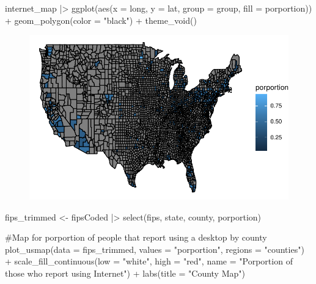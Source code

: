 \documentclass[
  letterpaper,
  DIV=11,
  numbers=noendperiod]{scrartcl}
\newenvironment{Shaded}{\begin{snugshade}}{\end{snugshade}}
\newcommand{\AttributeTok}[1]{\textcolor[rgb]{0.40,0.45,0.13}{#1}}
\newcommand{\CommentTok}[1]{\textcolor[rgb]{0.37,0.37,0.37}{#1}}
\newcommand{\FunctionTok}[1]{\textcolor[rgb]{0.28,0.35,0.67}{#1}}
\newcommand{\NormalTok}[1]{\textcolor[rgb]{0.00,0.23,0.31}{#1}}
\newcommand{\OtherTok}[1]{\textcolor[rgb]{0.00,0.23,0.31}{#1}}
\newcommand{\SpecialCharTok}[1]{\textcolor[rgb]{0.37,0.37,0.37}{#1}}
\newcommand{\StringTok}[1]{\textcolor[rgb]{0.13,0.47,0.30}{#1}}
\begin{document}
\begin{Shaded}
\begin{Highlighting}[]
\NormalTok{internet\_map }\SpecialCharTok{|\textgreater{}}
  \FunctionTok{ggplot}\NormalTok{(}\FunctionTok{aes}\NormalTok{(}\AttributeTok{x =}\NormalTok{ long, }\AttributeTok{y =}\NormalTok{ lat, }\AttributeTok{group =}\NormalTok{ group, }\AttributeTok{fill =}\NormalTok{ porportion)) }\SpecialCharTok{+}
  \FunctionTok{geom\_polygon}\NormalTok{(}\AttributeTok{color =} \StringTok{"black"}\NormalTok{) }\SpecialCharTok{+}
  \FunctionTok{theme\_void}\NormalTok{()}
\end{Highlighting}
\end{Shaded}

\begin{figure}[H]

{\centering \includegraphics{GeospatialMapping_files/figure-pdf/mapping-internet-use-1.pdf}

}

\end{figure}

\begin{Shaded}
\begin{Highlighting}[]
\NormalTok{fips\_trimmed }\OtherTok{\textless{}{-}}\NormalTok{ fipsCoded }\SpecialCharTok{|\textgreater{}}
  \FunctionTok{select}\NormalTok{(fips, state, county, porportion)}

\CommentTok{\#Map for porportion of people that report using a desktop by county}
\FunctionTok{plot\_usmap}\NormalTok{(}\AttributeTok{data =}\NormalTok{ fips\_trimmed, }
           \AttributeTok{values =} \StringTok{"porportion"}\NormalTok{,}
           \AttributeTok{regions =} \StringTok{"counties"}\NormalTok{) }\SpecialCharTok{+}
  \FunctionTok{scale\_fill\_continuous}\NormalTok{(}\AttributeTok{low =} \StringTok{"white"}\NormalTok{, }\AttributeTok{high =} \StringTok{"red"}\NormalTok{, }\AttributeTok{name =} \StringTok{"Porportion of those who report using Internet"}\NormalTok{) }\SpecialCharTok{+} 
  \FunctionTok{labs}\NormalTok{(}\AttributeTok{title =} \StringTok{"County Map"}\NormalTok{)}
\end{Highlighting}
\end{Shaded}
\end{document}

